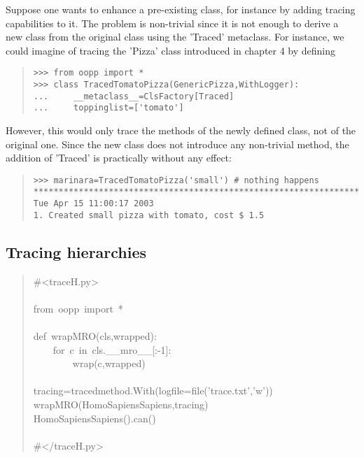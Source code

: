 \documentclass[10pt,english]{article}
\begin{document}
Suppose one wants to enhance a pre-existing class, for instance
by adding tracing capabilities to it. The problem is non-trivial
since it is not enough to derive a new class from the original
class using the 'Traced' metaclass. For instance, we could imagine of 
tracing the 'Pizza' class introduced in chapter 4 by defining
\begin{quote}
\begin{verbatim}>>> from oopp import *
>>> class TracedTomatoPizza(GenericPizza,WithLogger):
...     __metaclass__=ClsFactory[Traced] 
...     toppinglist=['tomato']\end{verbatim}
\end{quote}

However, this would only trace the methods of the newly defined class,
not of the original one. Since the new class does not introduce any 
non-trivial method, the addition of 'Traced' is practically without
any effect:
\begin{quote}
\begin{verbatim}>>> marinara=TracedTomatoPizza('small') # nothing happens
*****************************************************************************
Tue Apr 15 11:00:17 2003
1. Created small pizza with tomato, cost $ 1.5\end{verbatim}
\end{quote}



\hypertarget{tracing-hierarchies}{}
\subsection*{Tracing hierarchies}
\begin{quote}
\begin{ttfamily}\begin{flushleft}
\mbox{{\#}<traceH.py>}\\
\mbox{}\\
\mbox{from~oopp~import~*}\\
\mbox{}\\
\mbox{def~wrapMRO(cls,wrapped):}\\
\mbox{~~~~for~c~in~cls.{\_}{\_}mro{\_}{\_}[:-1]:}\\
\mbox{~~~~~~~~wrap(c,wrapped)}\\
\mbox{}\\
\mbox{tracing=tracedmethod.With(logfile=file('trace.txt','w'))}\\
\mbox{wrapMRO(HomoSapiensSapiens,tracing)}\\
\mbox{HomoSapiensSapiens().can()}\\
\mbox{}\\
\mbox{{\#}</traceH.py>}
\end{flushleft}\end{ttfamily}
\end{quote}
\end{document}
